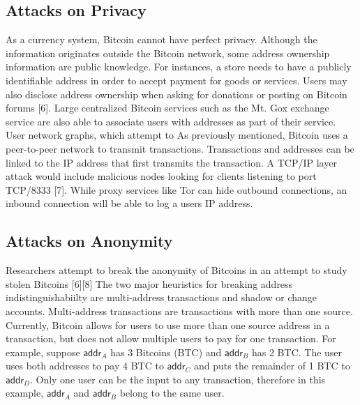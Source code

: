 
\subsection{Attacks on Privacy}
As a currency system, Bitcoin cannot have perfect privacy. Although the information originates outside the Bitcoin network, some address ownership information are public knowledge. For instances, a store needs to have a publicly identifiable address in order to accept payment for goods or services.  Users may also disclose address ownership when asking for donations or posting on Bitcoin forums [6]. Large centralized Bitcoin services such as the Mt. Gox exchange service are also able to associate users with addresses as part of their service.
User network graphs, which attempt to 
As previously mentioned, Bitcoin uses a peer-to-peer network to transmit transactions. Transactions and addresses can be linked to the IP address that first transmits the transaction. A TCP/IP layer attack would include malicious nodes looking for clients listening to port TCP/8333 [7]. While proxy services like Tor can hide outbound connections, an inbound connection will be able to log a users IP address.

\subsection{Attacks on Anonymity}
Researchers attempt to break the anonymity of Bitcoins in an attempt to study stolen Bitcoins [6][8] 
The two major heuristics for breaking address indistinguishabiilty are multi-address transactions and shadow or change accounts.
Multi-address transactions are transactions with more than one source. Currently, Bitcoin allows for users to use more than one source address in a transaction, but does not allow multiple users to pay for one transaction. For example, suppose $\mathsf{addr}_A$ has 3 Bitcoins (BTC) and $\mathsf{addr}_B$ has 2 BTC. The user uses both addresses to pay 4 BTC to $\mathsf{addr}_C$ and puts the remainder of 1 BTC to $\mathsf{addr}_D$. Only one user can be the input to any transaction, therefore in this example, $\mathsf{addr}_A$ and $\mathsf{addr}_B$ belong to the same user.

